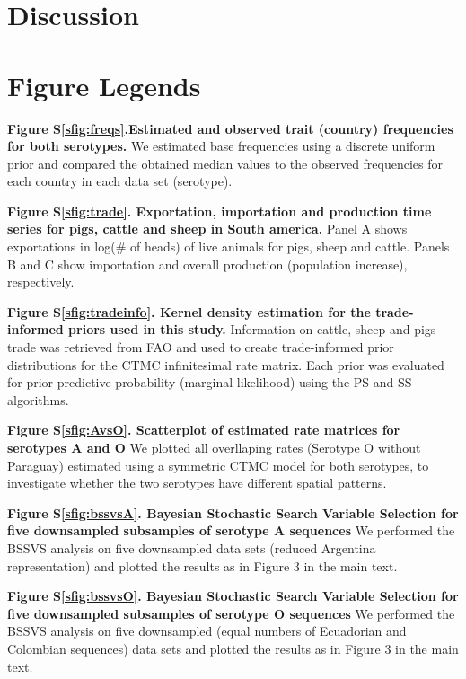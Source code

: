\documentclass[a4paper,10pt]{article}
\begin{document}
\section{Discussion}
\newpage
\section*{Figure Legends}
\textbf{Figure S\ref{sfig:freqs}.Estimated and observed trait (country) frequencies for both serotypes.} We estimated base frequencies using a discrete uniform prior and compared the obtained median values to the observed frequencies for each country in each data set (serotype). 

\textbf{Figure S\ref{sfig:trade}. Exportation, importation and production time series for pigs, cattle and sheep in South america.} Panel A shows exportations in log(\# of heads) of live animals for pigs, sheep and cattle.
Panels B and C show importation and overall production (population increase), respectively.

\textbf{Figure S\ref{sfig:tradeinfo}. Kernel density estimation for the trade-informed priors used in this study.} Information on cattle, sheep and pigs trade was retrieved from FAO and used to create trade-informed prior distributions for the CTMC infinitesimal rate matrix.
Each prior was evaluated for prior predictive probability (marginal likelihood) using the PS and SS algorithms. 

\textbf{Figure S\ref{sfig:AvsO}. Scatterplot of estimated rate matrices for serotypes A and O} We plotted all overllaping rates (Serotype O without Paraguay) estimated using a symmetric CTMC model for both serotypes, to investigate whether the two serotypes have different spatial patterns.

\textbf{Figure S\ref{sfig:bssvsA}. Bayesian Stochastic Search Variable Selection for five downsampled subsamples of serotype A sequences} We performed the BSSVS analysis on five downsampled data sets (reduced Argentina representation) and plotted the results as in Figure 3 in the main text.

\textbf{Figure S\ref{sfig:bssvsO}. Bayesian Stochastic Search Variable Selection for five downsampled subsamples of serotype O sequences} We performed the BSSVS analysis on five downsampled (equal numbers of Ecuadorian and Colombian sequences) data sets and plotted the results as in Figure 3 in the main text.
\end{document}
